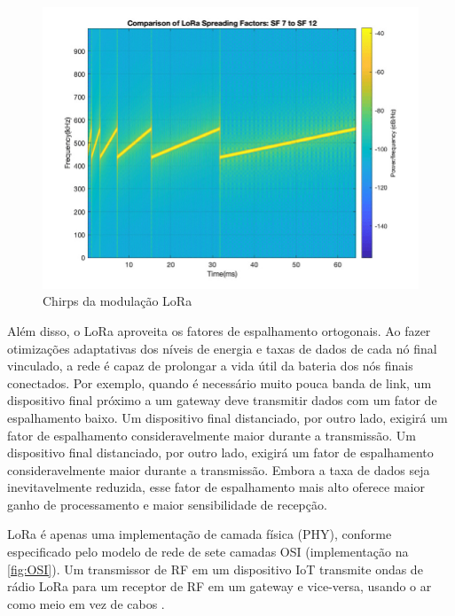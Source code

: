 \documentclass[
	12pt,				%
	openright,			%
	twoside,			%
	a4paper,			%
	english,			%
	french,				%
	spanish,			%
	brazil				%
	]{abntex2}
\begin{document}
\begin{figure}[H]
	\caption{\label{fig:chirp}Chirps da modulação LoRa}
	\begin{center}
	    \includegraphics[scale=0.45]{img/Chirp.jpg}
	\end{center}
\end{figure}

Além disso, o LoRa aproveita os fatores de espalhamento ortogonais. Ao fazer otimizações adaptativas dos níveis de energia e taxas de dados de cada nó final vinculado, a rede é capaz de prolongar a vida útil da bateria dos nós finais conectados. Por exemplo, quando é necessário muito pouca banda de link, um dispositivo final próximo a um gateway deve transmitir dados com um fator de espalhamento baixo. Um dispositivo final distanciado, por outro lado, exigirá um fator de espalhamento consideravelmente maior durante a transmissão. Um dispositivo final distanciado, por outro lado, exigirá um fator de espalhamento consideravelmente maior durante a transmissão. Embora a taxa de dados seja inevitavelmente reduzida, esse fator de espalhamento mais alto oferece maior ganho de processamento e maior sensibilidade de recepção.

LoRa é apenas uma implementação de camada física (PHY), conforme especificado pelo modelo de rede de sete camadas OSI (implementação na \autoref{fig:OSI}). Um transmissor de RF em um dispositivo IoT transmite ondas de rádio LoRa para um receptor de RF em um gateway e vice-versa, usando o ar como meio em vez de cabos \cite{semtech_2020}.
\end{document}
